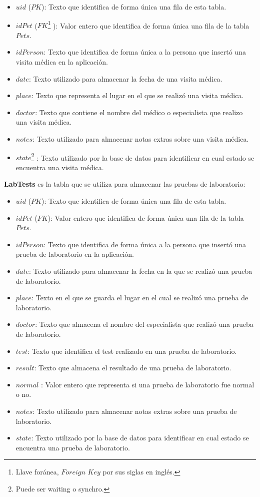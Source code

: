 \begin{itemize}
\item	$uid$ ($PK$): Texto que identifica de forma única una fila de esta tabla.
\item	$idPet$ ($FK$\footnote{Llave foránea, $Foreign$ $Key$ por sus siglas en inglés.} ): Valor entero que identifica de forma única una fila de la tabla $Pets$.
\item	$idPerson$: Texto que identifica de forma única a la persona que insertó una visita médica en la aplicación.
\item	$date$: Texto utilizado para almacenar la fecha de una visita médica.
\item	$place$: Texto que representa el lugar en el que se realizó una visita médica.
\item	$doctor$: Texto que contiene el nombre del médico o especialista que realizo una visita médica.
\item	$notes$: Texto utilizado para almacenar notas extras sobre una visita médica.
\item	$state$\footnote{Puede ser waiting o synchro.} : Texto utilizado por la base de datos para identificar en cual estado se encuentra una visita médica.
\end{itemize}

\textbf{LabTests} es la tabla que se utiliza para almacenar las pruebas de laboratorio:

\begin{itemize}
\item	$uid$ ($PK$): Texto que identifica de forma única una fila de esta tabla.
\item	$idPet$ ($FK$): Valor entero que identifica de forma única una fila de la tabla $Pets$.
\item	$idPerson$: Texto que identifica de forma única a la persona que insertó una prueba de laboratorio en la aplicación.
\item	$date$: Texto utilizado para almacenar la fecha en la que se realizó una prueba de laboratorio.
\item	$place$: Texto en el que se guarda el lugar en el cual se realizó una prueba de laboratorio.
\item	$doctor$: Texto que almacena el nombre del especialista que realizó una prueba de laboratorio.
\item	$test$: Texto que identifica el test realizado en una prueba de laboratorio.
\item	$result$: Texto que almacena el resultado de una prueba de laboratorio.
\item	$normal$ : Valor entero que representa si una prueba de laboratorio fue normal o no.
\item	$notes$: Texto utilizado para almacenar notas extras sobre una prueba de laboratorio.
\item	$state$: Texto utilizado por la base de datos para identificar en cual estado se encuentra una prueba de laboratorio.
\end{itemize}

